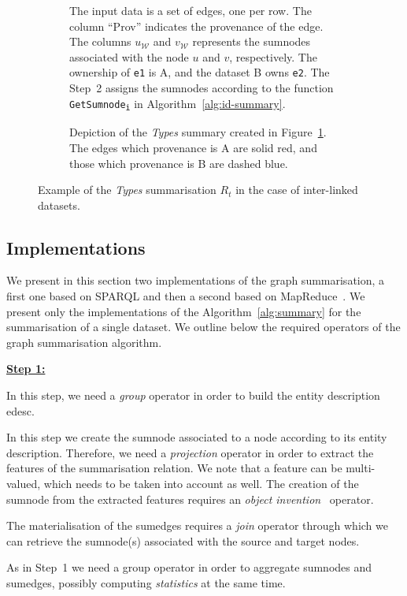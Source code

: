 \begin{figure}
	\centering
	\begin{subfigure}{\textwidth}
		\centering
		\resizebox{\textwidth}{!}{
			
		}
		\caption{The input data is a set of edges, one per row. The column ``Prov'' indicates the provenance of the edge. The columns $u_\mathcal{W}$ and $v_\mathcal{W}$ represents the sumnodes associated with the node $u$ and $v$, respectively. The ownership of \texttt{e1} is A, and the dataset B owns \texttt{e2}. The Step~2 assigns the sumnodes according to the function \texttt{GetSumnode\textsubscript{i}} in Algorithm~\ref{alg:id-summary}.}
		\label{tab:id-algo-ex}
	\end{subfigure}
	\quad
	\begin{subfigure}{.8\textwidth}
		\centering
		\resizebox{.8\textwidth}{!}{
			
		}
		\caption{Depiction of the \emph{Types} summary created in Figure~\ref{tab:id-algo-ex}. The edges which provenance is A are solid red, and those which provenance is B are dashed blue.}
		\label{fig:id-algo-ex}
	\end{subfigure}
	\caption{Example of the \emph{Types} summarisation $R_t$ in the case of inter-linked datasets.}
\end{figure}

\subsection{Implementations}
\label{sec:summary-impl}

We present in this section two implementations of the graph summarisation, a first one based on SPARQL and then a second based on MapReduce~\cite{dean:2004:msd}. We present only the implementations of the Algorithm~\ref{alg:summary} for the summarisation of a single dataset. We outline below the required operators of the graph summarisation algorithm.
\begin{labeling}{\textbf{\underline{Step 1:}}}
\item[\textbf{\underline{Step 1:}}] In this step, we need a \emph{group} operator in order to build the entity description \gls{edesc}.
\item[\textbf{\underline{Step 2:}}] In this step we create the sumnode associated to a node according to its entity description. Therefore, we need a \emph{projection} operator in order to extract the features of the summarisation relation. We note that a feature can be multi-valued, which needs to be taken into account as well. The creation of the sumnode from the extracted features requires an \emph{object invention}~\cite{hull:1989:usi} operator.
\item[\textbf{\underline{Step 3:}}] The materialisation of the sumedges requires a \emph{join} operator through which we can retrieve the sumnode(s) associated with the source and target nodes.
\item[\textbf{\underline{Step 4:}}] As in Step~1 we need a group operator in order to aggregate sumnodes and sumedges, possibly computing \emph{statistics} at the same time.
\end{labeling}

